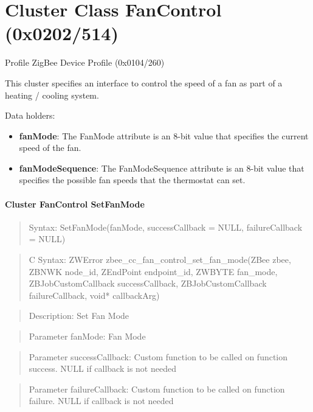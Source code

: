 \section{Cluster Class FanControl (0x0202/514)}

Profile ZigBee Device Profile (0x0104/260)

This cluster specifies an interface to control the speed of a fan as part of a heating / cooling system.
\newline

\noindent
Data holders:

\begin{itemize}
\item \textbf{fanMode}:         The FanMode attribute is an 8-bit value that specifies the current speed of the fan.
\item \textbf{fanModeSequence}: The FanModeSequence attribute is an 8-bit value that specifies the possible fan speeds that the thermostat can set.
\end{itemize}

\paragraph{Cluster FanControl SetFanMode}
\begin{quote}Syntax: SetFanMode(fanMode, successCallback = NULL, failureCallback = NULL)\end{quote}
\begin{quote}C Syntax: ZWError zbee\_cc\_fan\_control\_set\_fan\_mode(ZBee zbee, ZBNWK node\_id, ZEndPoint endpoint\_id, ZWBYTE fan\_mode, ZBJobCustomCallback successCallback, ZBJobCustomCallback failureCallback, void* callbackArg)\end{quote}
\begin{quote}Description: Set Fan Mode\end{quote}
\begin{quote}Parameter fanMode: Fan Mode\end{quote}
\begin{quote}Parameter successCallback: Custom function to be called on function success. NULL if callback is not needed\end{quote}
\begin{quote}Parameter failureCallback: Custom function to be called on function failure. NULL if callback is not needed\end{quote}


